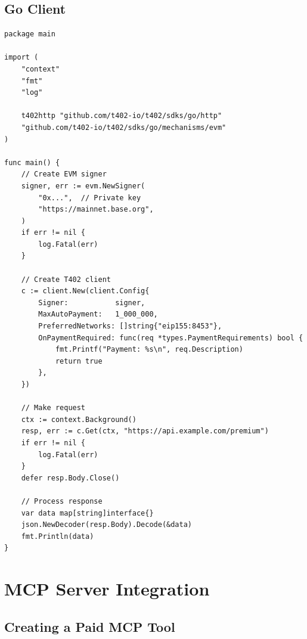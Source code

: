 \subsection{Go Client}

\begin{lstlisting}[language=golang,caption={Go client implementation}]
package main

import (
    "context"
    "fmt"
    "log"

    t402http "github.com/t402-io/t402/sdks/go/http"
    "github.com/t402-io/t402/sdks/go/mechanisms/evm"
)

func main() {
    // Create EVM signer
    signer, err := evm.NewSigner(
        "0x...",  // Private key
        "https://mainnet.base.org",
    )
    if err != nil {
        log.Fatal(err)
    }

    // Create T402 client
    c := client.New(client.Config{
        Signer:           signer,
        MaxAutoPayment:   1_000_000,
        PreferredNetworks: []string{"eip155:8453"},
        OnPaymentRequired: func(req *types.PaymentRequirements) bool {
            fmt.Printf("Payment: %s\n", req.Description)
            return true
        },
    })

    // Make request
    ctx := context.Background()
    resp, err := c.Get(ctx, "https://api.example.com/premium")
    if err != nil {
        log.Fatal(err)
    }
    defer resp.Body.Close()

    // Process response
    var data map[string]interface{}
    json.NewDecoder(resp.Body).Decode(&data)
    fmt.Println(data)
}
\end{lstlisting}

\section{MCP Server Integration}
\label{sec:mcp-integration}

\subsection{Creating a Paid MCP Tool}


